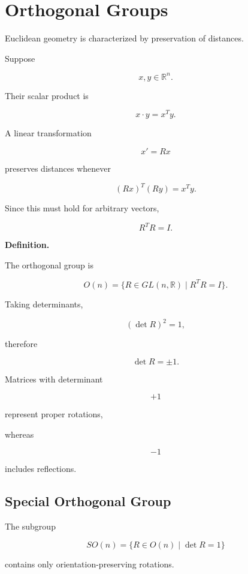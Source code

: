 \section{Orthogonal Groups}

Euclidean geometry is characterized by preservation of distances.

Suppose

\[
x,y\in\mathbb R^n.
\]

Their scalar product is

\[
x\cdot y
=
x^Ty.
\]

A linear transformation

\[
x'
=
Rx
\]

preserves distances whenever

\[
(Rx)^T(Ry)
=
x^Ty.
\]

Since this must hold for arbitrary vectors,

\[
R^TR
=
I.
\]


\textbf{Definition.}

The orthogonal group is

\[
O(n)
=
\{
R
\in
GL(n,\mathbb R)
\;|\;
R^TR=I
\}.
\]


Taking determinants,

\[
(\det R)^2=1,
\]

therefore

\[
\det R=\pm1.
\]

Matrices with determinant

\[
+1
\]

represent proper rotations,

whereas

\[
-1
\]

includes reflections.


\subsection{Special Orthogonal Group}

The subgroup

\[
SO(n)
=
\{
R
\in
O(n)
\;|\;
\det R=1
\}
\]

contains only orientation-preserving rotations.

